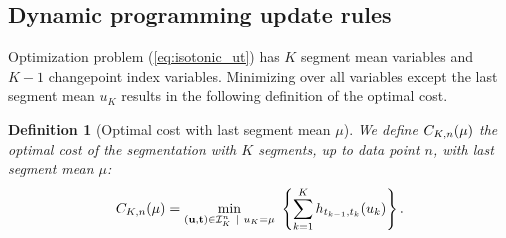\documentclass{article}
\newtheorem{lemma}{Lemma}
\newtheorem{definition}{Definition}
\begin{document}


\subsection{Dynamic programming update rules}
\label{sec:dyn-prog}
Optimization problem (\ref{eq:isotonic_ut}) has $K$ segment mean
variables and $K-1$ changepoint index variables. Minimizing over all
variables except the last segment mean $u_K$ results in the following
definition of the optimal cost.



\begin{definition}[Optimal cost with last segment mean $\mu$]
\label{def:fcc}
  We define $C_{K,n}(\mu)$ the optimal cost of the segmentation
  with $K$ segments, up to data point $n$, with last segment mean
  $\mu$:
\begin{equation}
C_{K,n}(\mu) = \min_{(\mathbf u, \mathbf t)\in{\mathcal I}^n_K \ | \ u_K = \mu} \
  \left\{ \sum_{k=1}^K
  h_{t_{k-1}, t_k}(u_k) \right\}.
\end{equation}
\end{definition}
\end{document}
